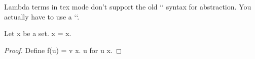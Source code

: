 Lambda terms in tex mode don't support the old `\x` syntax for abstraction. You actually have to use a `\lambda`.

\begin{forthel}
  \begin{lemma}
    Let x be a set. x = x.
  \end{lemma}
  \begin{proof}
    Define f(u) = \lambda v \in x. u for u \in x.
  \end{proof}
\end{forthel}